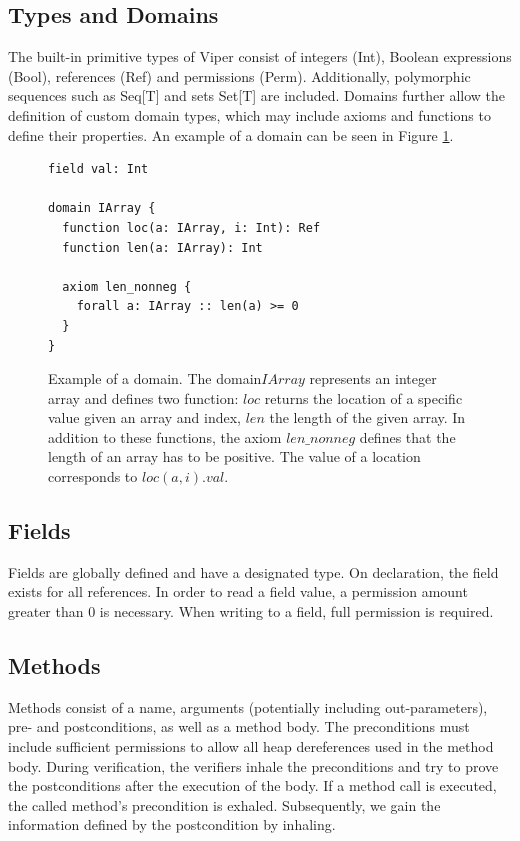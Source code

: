 \documentclass[12pt]{article}
\begin{document}
\subsection{Types and Domains}
The built-in primitive types of Viper consist of integers (Int), Boolean expressions (Bool), references (Ref) and permissions (Perm). Additionally,  polymorphic sequences such as Seq[T] and sets Set[T] are included. Domains further allow the definition of custom domain types, which may include axioms and functions to define their properties. An example of a domain can be seen in Figure \ref{domainExample}.

\begin{figure}[h]
  \centering
\begin{lstlisting}
field val: Int

domain IArray {
  function loc(a: IArray, i: Int): Ref
  function len(a: IArray): Int

  axiom len_nonneg {
    forall a: IArray :: len(a) >= 0
  }
}
\end{lstlisting}
\caption[predicate example]
   {Example of a domain. The domain\(IArray\) represents an integer array and defines two function: \(loc\) returns the location of a specific value given an array and index, \(len\) the length of the given array. In addition to these functions, the axiom \(len\_nonneg\) defines that the length of an array has to be positive. The value of a location corresponds to \(loc(a, i).val\).}
\label{domainExample}
\end{figure}

\subsection{Fields}
Fields are globally defined and have a designated type. On declaration, the field exists for all references. In order to read a field value, a permission amount greater than 0 is necessary. When writing to a field, full permission is required.

\subsection{Methods}
Methods consist of a name, arguments (potentially including out-parameters), pre- and postconditions, as well as a method body. The preconditions must include sufficient permissions to allow all heap dereferences used in the method body. During verification, the verifiers inhale the preconditions and try to prove the postconditions after the execution of the body. If a method call is executed, the called method's precondition is exhaled. Subsequently, we gain the information defined by the postcondition by inhaling.
\end{document}

